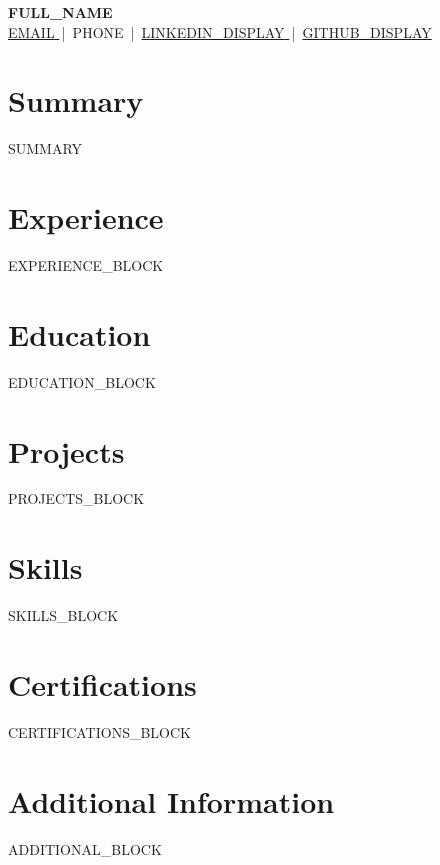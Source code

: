 \documentclass[a4paper,10pt]{article}
\begin{document}
\begin{center}
  {\LARGE\textbf{ {{FULL_NAME}} }}\\[4pt]
  {\small
    \href{mailto:{{EMAIL}}}{ {{EMAIL}} } \,|\, {{PHONE}} \,|\,
    \href{ {{LINKEDIN_URL}} }{ {{LINKEDIN_DISPLAY}} } \,|\,
    \href{ {{GITHUB_URL}} }{ {{GITHUB_DISPLAY}} }
  }
\end{center}

\section*{Summary}
{{SUMMARY}}

\section*{Experience}
{{EXPERIENCE_BLOCK}}

\section*{Education}
{{EDUCATION_BLOCK}}

\section*{Projects}
{{PROJECTS_BLOCK}}

\section*{Skills}
{{SKILLS_BLOCK}}

\section*{Certifications}
{{CERTIFICATIONS_BLOCK}}

\section*{Additional Information}
{{ADDITIONAL_BLOCK}}
\end{document}
